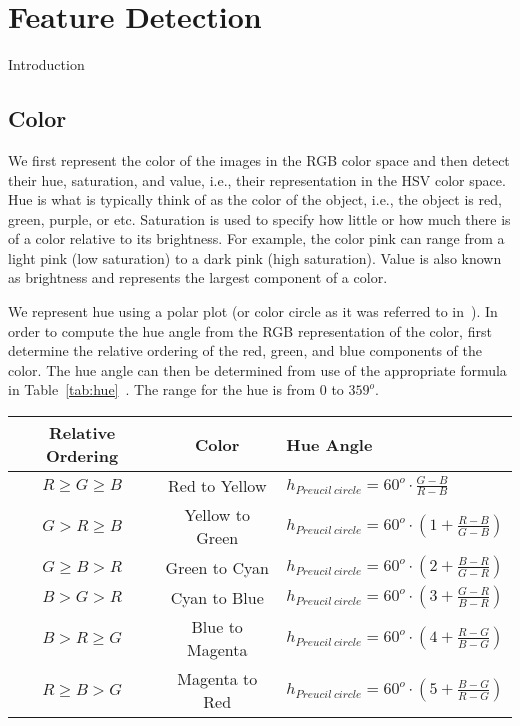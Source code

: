 \section{Feature Detection}
Introduction
\subsection{Color}
We first represent the color of the images in the RGB color space 
and then detect their hue, saturation, and value, i.e., their 
representation in the HSV color space.  Hue is what is typically
think of as the color of the object, i.e., the object is red,
green, purple, or etc.  Saturation is used to specify how little
or how much there is of a color relative to its brightness.  For
example, the color pink can range from a light pink (low saturation)
to a dark pink (high saturation).  Value is also known as 
brightness and represents the largest component of a color.

We represent hue using a polar plot (or color circle as it was
referred to in~\cite{preucil}).  In order to 
compute the hue angle from the RGB representation of the color,
first determine the relative ordering of the red, green, and blue
components of the color.  The hue angle can then be determined from 
use of the appropriate formula in Table~\ref{tab:hue}~\cite{preucil}.
The range for the hue is from $0$ to $359^{o}$.

\begin{table*} 
\centering   
\begin{tabular}{| c | c | l |}   \hline
{\bf{Relative Ordering}} & {\bf{Color}} & {\bf{Hue Angle}} \\ \hline
$R \geq G \geq B$ &  Red to Yellow & $h_{Preucil \ circle} = 60^{o} \cdot \frac{G-B}{R-B}$  \\ \hline
$G > R \geq B$ & Yellow to Green & $h_{Preucil \ circle} = 60^{o} \cdot \left(1+\frac{R-B}{G-B}\right)$ \\ \hline
$G \geq B > R$ & Green to Cyan & $h_{Preucil \ circle} = 60^{o} \cdot \left(2 + \frac{B-R}{G-R} \right)$\\ \hline
$B > G > R$ & Cyan to Blue & $h_{Preucil \ circle} = 60^{o} \cdot \left(3 + \frac{G-R}{B-R} \right)$\\ \hline
$B > R \geq G$ & Blue to Magenta & $h_{Preucil \ circle} = 60^{o} \cdot \left(4 + \frac{R-G}{B-G}\right)$ \\ \hline
$R \geq B > G$ & Magenta to Red & $h_{Preucil \ circle} = 60^{o} \cdot \left(5 + \frac{B-G}{R-G}\right)$ \\ \hline
\end{tabular}   
\caption{Formulas used to convert RGB color into
hue for the HSV color space~\cite{preucil}.}  
\label{tab:hue} 
\end{table*} 

